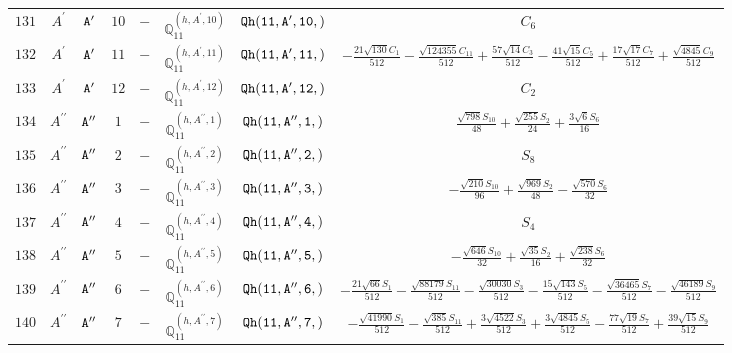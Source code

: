 \documentclass[fleqn,8pt]{jsarticle}
\begin{document}
\begin{table}[ht!]
\begin{center}
\begin{tabular}{cccccccc}
$ 131 $ & $ A^{\prime} $ & $ {\tt A'} $ & $ 10 $ & $ - $ & $ \mathbb{Q}_{11}^{(h,A^{\prime},10)} $ & $ {\tt Qh(11,A',10,)} $ & $ C_{6} $ \\
$ 132 $ & $ A^{\prime} $ & $ {\tt A'} $ & $ 11 $ & $ - $ & $ \mathbb{Q}_{11}^{(h,A^{\prime},11)} $ & $ {\tt Qh(11,A',11,)} $ & $ - \frac{21 \sqrt{130} C_{1}}{512} - \frac{\sqrt{124355} C_{11}}{512} + \frac{57 \sqrt{14} C_{3}}{512} - \frac{41 \sqrt{15} C_{5}}{512} + \frac{17 \sqrt{17} C_{7}}{512} + \frac{\sqrt{4845} C_{9}}{512} $ \\
$ 133 $ & $ A^{\prime} $ & $ {\tt A'} $ & $ 12 $ & $ - $ & $ \mathbb{Q}_{11}^{(h,A^{\prime},12)} $ & $ {\tt Qh(11,A',12,)} $ & $ C_{2} $ \\
$ 134 $ & $ A^{\prime\prime} $ & $ {\tt A''} $ & $ 1 $ & $ - $ & $ \mathbb{Q}_{11}^{(h,A^{\prime\prime},1)} $ & $ {\tt Qh(11,A'',1,)} $ & $ \frac{\sqrt{798} S_{10}}{48} + \frac{\sqrt{255} S_{2}}{24} + \frac{3 \sqrt{6} S_{6}}{16} $ \\
$ 135 $ & $ A^{\prime\prime} $ & $ {\tt A''} $ & $ 2 $ & $ - $ & $ \mathbb{Q}_{11}^{(h,A^{\prime\prime},2)} $ & $ {\tt Qh(11,A'',2,)} $ & $ S_{8} $ \\
$ 136 $ & $ A^{\prime\prime} $ & $ {\tt A''} $ & $ 3 $ & $ - $ & $ \mathbb{Q}_{11}^{(h,A^{\prime\prime},3)} $ & $ {\tt Qh(11,A'',3,)} $ & $ - \frac{\sqrt{210} S_{10}}{96} + \frac{\sqrt{969} S_{2}}{48} - \frac{\sqrt{570} S_{6}}{32} $ \\
$ 137 $ & $ A^{\prime\prime} $ & $ {\tt A''} $ & $ 4 $ & $ - $ & $ \mathbb{Q}_{11}^{(h,A^{\prime\prime},4)} $ & $ {\tt Qh(11,A'',4,)} $ & $ S_{4} $ \\
$ 138 $ & $ A^{\prime\prime} $ & $ {\tt A''} $ & $ 5 $ & $ - $ & $ \mathbb{Q}_{11}^{(h,A^{\prime\prime},5)} $ & $ {\tt Qh(11,A'',5,)} $ & $ - \frac{\sqrt{646} S_{10}}{32} + \frac{\sqrt{35} S_{2}}{16} + \frac{\sqrt{238} S_{6}}{32} $ \\
$ 139 $ & $ A^{\prime\prime} $ & $ {\tt A''} $ & $ 6 $ & $ - $ & $ \mathbb{Q}_{11}^{(h,A^{\prime\prime},6)} $ & $ {\tt Qh(11,A'',6,)} $ & $ - \frac{21 \sqrt{66} S_{1}}{512} - \frac{\sqrt{88179} S_{11}}{512} - \frac{\sqrt{30030} S_{3}}{512} - \frac{15 \sqrt{143} S_{5}}{512} - \frac{\sqrt{36465} S_{7}}{512} - \frac{\sqrt{46189} S_{9}}{512} $ \\
$ 140 $ & $ A^{\prime\prime} $ & $ {\tt A''} $ & $ 7 $ & $ - $ & $ \mathbb{Q}_{11}^{(h,A^{\prime\prime},7)} $ & $ {\tt Qh(11,A'',7,)} $ & $ - \frac{\sqrt{41990} S_{1}}{512} - \frac{\sqrt{385} S_{11}}{512} + \frac{3 \sqrt{4522} S_{3}}{512} + \frac{3 \sqrt{4845} S_{5}}{512} - \frac{77 \sqrt{19} S_{7}}{512} + \frac{39 \sqrt{15} S_{9}}{512} $ \\

\end{tabular}
\end{center}
\end{table}
\end{document}
